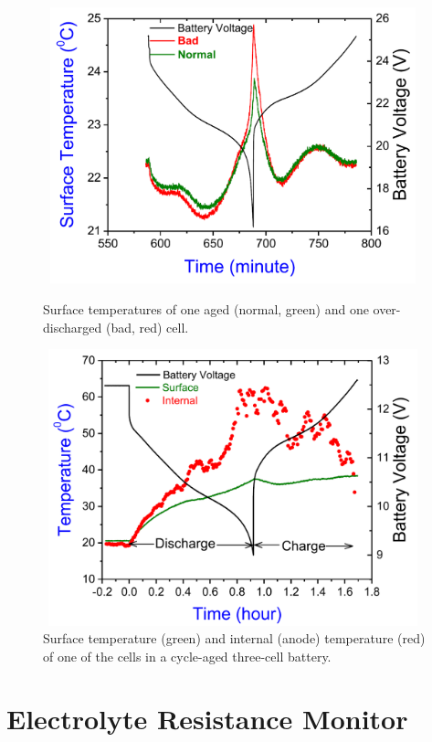 \begin{figure}[H]
	\includegraphics[width=11cm,height=8cm]{figures/tem1}
	\centering
	\caption{Surface temperatures of one aged (normal, green) and one over-discharged (bad, red) cell.}\label{tem1}\vspace{0.5cm}

	\includegraphics[width=11cm,height=8cm]{figures/tem2}
	\centering
	\caption{
		Surface temperature (green) and internal (anode) temperature (red) of one of the cells in a cycle-aged three-cell battery.}\label{tem2}
\end{figure}

\section{Electrolyte Resistance Monitor}

